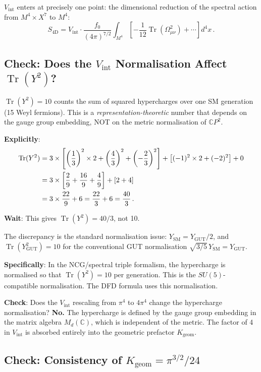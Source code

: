 \documentclass[11pt,a4paper]{article}
\newcommand{\Tr}{\operatorname{Tr}}
\newcommand{\CP}{\mathbb{C}P}
\begin{document}
$V_{\mathrm{int}}$ enters at precisely one point: the dimensional reduction of the spectral action from $M^4 \times X^7$ to $M^4$:
\begin{equation}
S_{\mathrm{4D}} = V_{\mathrm{int}} \cdot \frac{f_0}{(4\pi)^{7/2}} \int_{M^4} \left[-\frac{1}{12}\Tr(\Omega_{\mu\nu}^2) + \cdots\right] d^4x\,.
\end{equation}

\subsection{Check: Does the $V_{\mathrm{int}}$ Normalisation Affect $\Tr(Y^2)$?}

$\Tr(Y^2) = 10$ counts the sum of squared hypercharges over one SM generation (15 Weyl fermions). This is a \emph{representation-theoretic} number that depends on the gauge group embedding, NOT on the metric normalisation of $\CP^2$.

\textbf{Explicitly}:
\begin{align}
\Tr(Y^2) &= 3 \times \left[\left(\frac{1}{3}\right)^2 \times 2 + \left(\frac{4}{3}\right)^2 + \left(-\frac{2}{3}\right)^2\right] + \left[(-1)^2 \times 2 + (-2)^2\right] + 0 \notag\\
&= 3 \times \left[\frac{2}{9} + \frac{16}{9} + \frac{4}{9}\right] + [2 + 4] \notag\\
&= 3 \times \frac{22}{9} + 6 = \frac{22}{3} + 6 = \frac{40}{3}\,.
\end{align}

\textbf{Wait}: This gives $\Tr(Y^2) = 40/3$, not 10.

The discrepancy is the standard normalisation issue: $Y_{\mathrm{SM}} = Y_{\mathrm{GUT}} / 2$, and $\Tr(Y_{\mathrm{GUT}}^2) = 10$ for the conventional GUT normalisation $\sqrt{3/5}\,Y_{\mathrm{SM}} = Y_{\mathrm{GUT}}$.

\textbf{Specifically}: In the NCG/spectral triple formalism, the hypercharge is normalised so that $\Tr(Y^2) = 10$ per generation. This is the $SU(5)$-compatible normalisation. The DFD formula uses this normalisation.

\textbf{Check}: Does the $V_{\mathrm{int}}$ rescaling from $\pi^4$ to $4\pi^4$ change the hypercharge normalisation? \textbf{No.} The hypercharge is defined by the gauge group embedding in the matrix algebra $M_d(\mathbb{C})$, which is independent of the metric. The factor of 4 in $V_{\mathrm{int}}$ is absorbed entirely into the geometric prefactor $K_{\mathrm{geom}}$.

\subsection{Check: Consistency of $K_{\mathrm{geom}} = \pi^{3/2}/24$}
\end{document}

